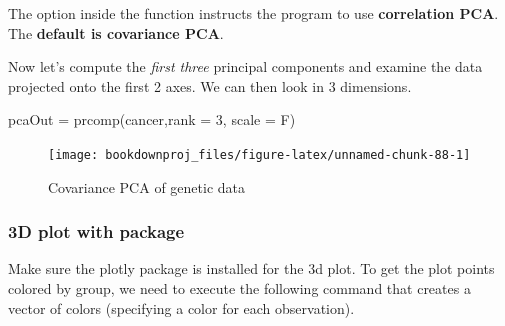 \documentclass[
]{article}
\newenvironment{Shaded}{\begin{snugshade}}{\end{snugshade}}
\newcommand{\AttributeTok}[1]{\textcolor[rgb]{0.77,0.63,0.00}{#1}}
\newcommand{\DecValTok}[1]{\textcolor[rgb]{0.00,0.00,0.81}{#1}}
\newcommand{\FunctionTok}[1]{\textcolor[rgb]{0.00,0.00,0.00}{#1}}
\newcommand{\NormalTok}[1]{#1}
\newcommand{\OtherTok}[1]{\textcolor[rgb]{0.56,0.35,0.01}{#1}}
\newcommand{\SpecialCharTok}[1]{\textcolor[rgb]{0.00,0.00,0.00}{#1}}
\newcommand{\StringTok}[1]{\textcolor[rgb]{0.31,0.60,0.02}{#1}}
\theoremstyle{definition}
\theoremstyle{definition}
\theoremstyle{definition}
\theoremstyle{definition}
\theoremstyle{remark}
\begin{document}
The option  inside the  function instructs the program to use \textbf{correlation PCA}. The \textbf{default is covariance PCA}.

Now let's compute the \emph{first three} principal components and examine the data projected onto the first 2 axes. We can then look in 3 dimensions.

\begin{Shaded}
\begin{Highlighting}[]
\NormalTok{pcaOut }\OtherTok{=} \FunctionTok{prcomp}\NormalTok{(cancer,}\AttributeTok{rank =} \DecValTok{3}\NormalTok{, }\AttributeTok{scale =}\NormalTok{ F)}
\end{Highlighting}
\end{Shaded}

\begin{Shaded}
\end{Shaded}

\begin{figure}

{\centering \texttt{[image: bookdownproj\_files/figure-latex/unnamed-chunk-88-1]} 

}

\caption{Covariance PCA of genetic data}\label{fig:unnamed-chunk-88}
\end{figure}

\hypertarget{d-plot-with-package}{%
\subsubsection{\texorpdfstring{3D plot with  package}{3D plot with  package}}\label{d-plot-with-package}}

Make sure the plotly package is installed for the 3d plot. To get the plot points colored by group, we need to execute the following command that creates a vector of colors (specifying a color for each observation).
\end{document}
